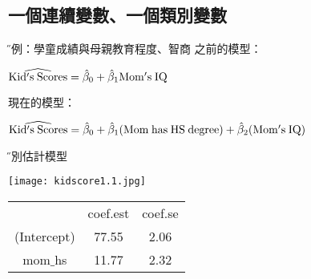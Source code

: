 \documentclass[xcolor=dvipsnames]{beamer}
\begin{document}
\subsection{一個連續變數、一個類別變數}
\begin{frame}{\H 實例：學童成績與母親教育程度、智商}
之前的模型：
\begin{center}
$\widehat{\mathrm {Kid's\hspace{.25em} Scores}}=\hat{\beta}_{0}+\hat{\beta}_{1}\mathrm {Mom's\hspace{.25em} IQ}$
\end{center}
現在的模型：
\begin{center}
$\widehat{\mathrm {Kid's\hspace{.25em} Scores}}=\hat{\beta}_{0}+\hat{\beta}_{1}(\mathrm {Mom\hspace{.25em} has\hspace{.25em} HS\hspace{.25em} degree})+\hat{\beta}_{2}(\mathrm {Mom's\hspace{.25em} IQ})$
\end{center}
\end{frame}
\begin{frame}{\H 分別估計模型}
 \begin{minipage}{\textwidth}
 \begin{minipage}[b]{0.49\textwidth}
    \centering
     \texttt{[image: kidscore1.1.jpg]}
  \end{minipage}
  \hfill
 \begin{minipage}[b]{0.49\textwidth}
    \centering
   \begin{tabular}{|c c c|}
\hline
 & coef.est & coef.se \\

(Intercept) & 77.55 & 2.06  \\
mom$\_$hs & 11.77  &   2.32 \\
\hline
     \end{tabular}
  \end{minipage}
\end{minipage}
\end{frame} 
\end{document}
